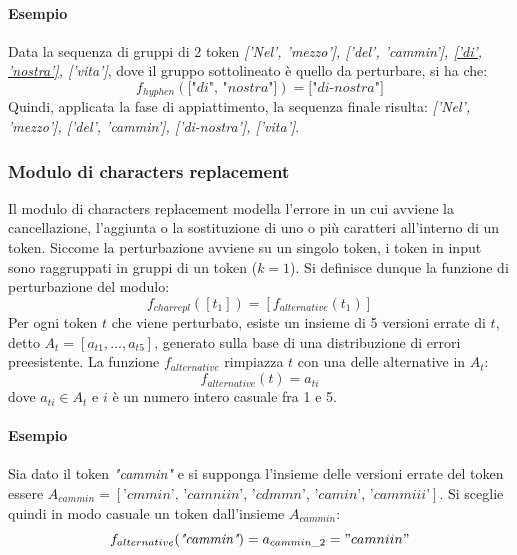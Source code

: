 \paragraph{Esempio} Data la sequenza di gruppi di 2 token \textit{['Nel', 'mezzo'], ['del', 'cammin'], \underline{['di', 'nostra']}, ['vita']}, dove il gruppo sottolineato è quello da perturbare, si ha che:
\begin{equation}
f_{hyphen}(\textit{["di", "nostra"]}) = \textit{["di-nostra"]}
\end{equation}
Quindi, applicata la fase di appiattimento, la sequenza finale risulta: \textit{['Nel', 'mezzo'], ['del', 'cammin'], {['di-nostra']}, ['vita']}.

\subsubsection{Modulo di characters replacement}
Il modulo di characters replacement modella l'errore in un cui avviene la cancellazione, l'aggiunta o la sostituzione di uno o più caratteri all'interno di un token. Siccome la perturbazione avviene su un singolo token, i token in input sono raggruppati in gruppi di un token ($k = 1$). Si definisce dunque la funzione di perturbazione del modulo:
\begin{equation}
f_{charrepl}([t_1]) = [f_{alternative}(t_1)]
\end{equation}
Per ogni token $t$ che viene perturbato, esiste un insieme di 5 versioni errate di $t$, detto $A_t = [a_{t1},...,a_{t5}]$, generato sulla base di una distribuzione di errori preesistente. La funzione $f_{alternative}$ rimpiazza $t$ con una delle alternative in $A_t$:
\begin{equation}
f_{alternative}(t) = a_{ti}
\end{equation}
dove $a_{ti} \in A_t$ e $i$ è un numero intero casuale fra 1 e 5.

\paragraph{Esempio} Sia dato il token \textit{"cammin"} e si supponga l'insieme delle versioni errate del token essere $A_{cammin} = [\textit{'cmmin', 'camniin', 'cdmmn', 'camin', 'cammiii'}]$. Si sceglie quindi in modo casuale un token dall'insieme $A_{cammin}$:
\begin{equation}
f_{alternative}(\textit{"cammin"}) = a_{cammin\_2} ="camniin"
\end{equation}


